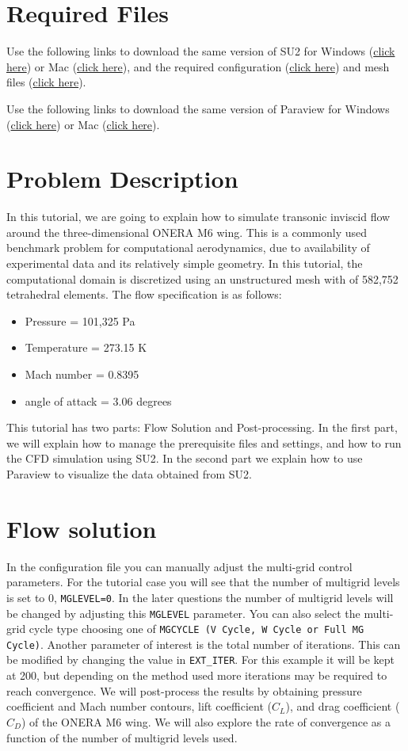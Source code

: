 \section{Required Files}
\begin{su2note}
	Use the following links to download the same version of SU2 for Windows (\href{}{click here}) or Mac (\href{}{click here}), and the required configuration (\href{}{click here}) and mesh files (\href{}{click here}).
\end{su2note}
\begin{paraviewnote}
	Use the following links to download the same version of Paraview for Windows (\href{}{click here}) or Mac (\href{}{click here}).
\end{paraviewnote}
\section{Problem Description}
In this tutorial, we are going to explain how to simulate transonic inviscid flow around the three-dimensional ONERA M6 wing. This is a commonly used benchmark problem for computational aerodynamics, due to availability of experimental data and its relatively simple geometry. In this tutorial, the computational domain is discretized using an unstructured mesh with of 582,752 tetrahedral elements. The flow specification is as follows:
\begin{itemize}
    \item Pressure = 101,325 Pa
    \item Temperature = 273.15 K
    \item Mach number = 0.8395
    \item angle of attack = 3.06 degrees
\end{itemize}

This tutorial has two parts: Flow Solution and Post-processing. In the first part, we will explain how to manage the prerequisite files and settings, and how to run the CFD simulation using SU2. In the second part we explain how to use Paraview to visualize the data obtained from SU2.
\section{Flow solution}
In the configuration file you can manually adjust the multi-grid control parameters. For the tutorial case you will see that the number of multigrid levels is set to 0, \texttt{MGLEVEL=0}. In the later questions the number of multigrid levels will be changed by adjusting this \texttt{MGLEVEL} parameter. You can also select the multi-grid cycle type choosing one of \texttt{MGCYCLE (V Cycle, W Cycle or Full MG Cycle)}. Another parameter of interest is the total number of iterations. This can be modified by changing the value in \texttt{EXT\_ITER}. For this example it will be kept at 200, but depending on the method used more iterations may be required to reach convergence. We will post-process the results by obtaining pressure coefficient and Mach number contours, lift coefficient ($C_L$), and drag coefficient ($C_D$) of the ONERA M6 wing. We will also explore the rate of convergence as a function of the number of multigrid levels used.

